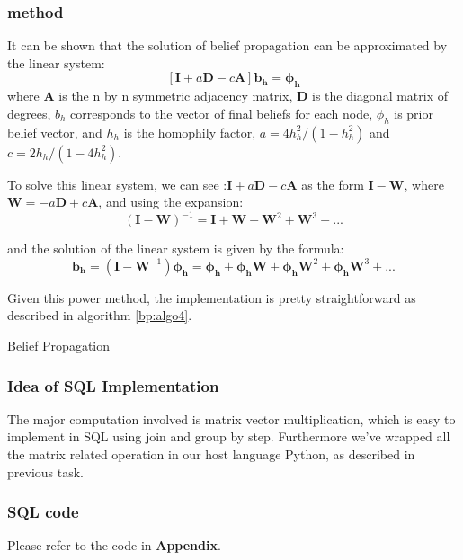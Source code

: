 \subsubsection{method}
It can be shown that the solution of belief propagation can be approximated by the linear system:$$[\mathbf{I}	 + a\mathbf{D} - c\mathbf{A}]\mathbf{b_h} = \mathbf{\phi_h}$$ 
where $\mathbf{A}$ is the n by n symmetric adjacency matrix, $\mathbf{D}$ is the diagonal matrix of degrees, $b_h$ corresponds to the vector of final beliefs for each node, $\phi_h$ is prior belief vector, and $h_h$ is the homophily factor,  $a = 4h_h^2/(1 - h_h^2)$ and $c = 2h_h / (1-4h_h^2)$.

To solve this linear system, we can see :$\mathbf{I} + a\mathbf{D} - c\mathbf{A}$ as the form $\mathbf{I} - \mathbf{W}$, where $\mathbf{W} = -a\mathbf{D} + c\mathbf{A}$, and using the expansion:$$(\mathbf{I} - \mathbf{W})^{-1} = \mathbf{I} + \mathbf{W} + \mathbf{W}^2 + \mathbf{W}^3 + ...$$

and the solution of the linear system is given by the formula:
$$\mathbf{b_h} = (\mathbf{I} - \mathbf{W}^{-1})\mathbf{\phi_h} =\mathbf{\phi_h}  + \mathbf{\phi_h} \mathbf{W} + \mathbf{\phi_h} \mathbf{W}^2 + \mathbf{\phi_h} \mathbf{W}^3 + ...$$

Given this power method, the implementation is pretty straightforward as described in algorithm \ref{bp:algo4}.
\begin{algorithm}[!htbf]
\caption{Belief Propagation}
\begin{algorithmic}
\REPEAT
{}
\end{algorithmic}
\label{bp:algo4}
\end{algorithm}

\subsubsection{Idea of SQL Implementation}
The major computation involved is matrix vector multiplication, which is easy to implement in SQL using join and group by step. Furthermore we've wrapped all the matrix related operation in our host language Python, as described in previous task.

\subsubsection{SQL code}
Please refer to the code in {\bf Appendix}.

